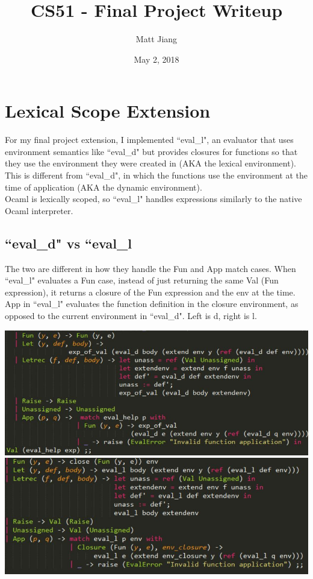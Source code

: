 \documentclass{article}
\title{CS51 - Final Project Writeup}
\author{Matt Jiang}
\date{May 2, 2018}
\begin{document}
\maketitle

\section{Lexical Scope Extension}
For my final project extension, I implemented ``eval\_l", an evaluator that uses environment semantics like ``eval\_d" but provides closures for functions so that they use the environment they were created in (AKA the lexical environment). This is different from ``eval\_d", in which the functions use the environment at the time of application (AKA the dynamic environment). \\

Ocaml is lexically scoped, so ``eval\_l" handles expressions similarly to the native Ocaml interpreter. 

\subsection{``eval\_d" vs ``eval\_l}

The two are different in how they handle the Fun and App match cases. When ``eval\_l" evaluates a Fun case, instead of just returning the same Val (Fun expression), it returns a closure of the Fun expression and the env at the time. App in ``eval\_l" evaluates the function definition in the closure environment, as opposed to the current environment in ``eval\_d". Left is d, right is l.

\begin{center}
   \includegraphics[scale=0.3]{Capture}    \includegraphics[scale=0.335]{1}
\end{center}
\end{document}
